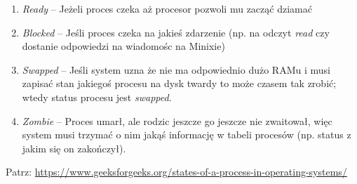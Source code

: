 \begin{enumerate}
	\item \textit{Ready} -- Jeżeli proces czeka aż procesor pozwoli mu zacząć dziamać
	\item \textit{Blocked} -- Jeśli proces czeka na jakieś zdarzenie (np. na odczyt \textit{read} czy dostanie odpowiedzi na wiadomośc na Minixie)
	\item \textit{Swapped} -- Jeśli system uzna że nie ma odpowiednio dużo RAMu i musi zapisać stan jakiegoś procesu na dysk twardy to może czasem tak zrobić; wtedy status procesu jest \textit{swapped}.
	\item \textit{Zombie} -- Proces umarł, ale rodzic jeszcze go jeszcze nie zwaitował, więc system musi trzymać o nim jakąś informację w tabeli procesów (np. status z jakim się on zakończył).
\end{enumerate}

Patrz: \url{https://www.geeksforgeeks.org/states-of-a-process-in-operating-systems/}
